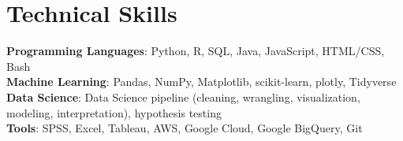 \section{Technical Skills}
 \begin{itemize}[leftmargin=0.15in, label={}]
    \small{\item{
     \textbf{Programming Languages}{: Python, R, SQL, Java, JavaScript, HTML/CSS, Bash} \\
     \textbf{Machine Learning}{: Pandas, NumPy, Matplotlib, scikit-learn, plotly, Tidyverse}\\
     \textbf{Data Science}{: Data Science pipeline (cleaning, wrangling, visualization, modeling, interpretation), hypothesis testing}\\
     \textbf{Tools}{: SPSS, Excel, Tableau, AWS, Google Cloud, Google BigQuery, Git}\\
    }}
 \end{itemize}